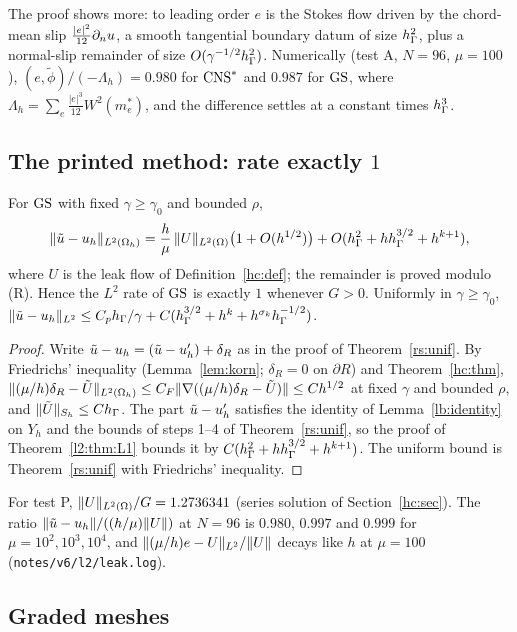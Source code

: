 The proof shows more: to leading order $e$ is the Stokes flow driven by the chord-mean slip $\frac{|e|^2}{12}\partial_n u$, a smooth tangential boundary datum of size $h_\Gamma^2$, plus a normal-slip remainder of size $O(\gamma^{-1/2}h_\Gamma^2)$. Numerically (test A, $N=96$, $\mu=100$), $(e,\tilde\phi)/(-\Lambda_h)=0.980$ for $\mathrm{CNS}^\ast$ and $0.987$ for $\GS$, where $\Lambda_h=\sum_e\frac{|e|^3}{12}W^2(m_e^\ast)$, and the difference settles at a constant times $h_\Gamma^3$.

\subsection{The printed method: rate exactly \texorpdfstring{$1$}{1}}

\begin{theorem}[$L^2$ error of $\GS$]\label{l2:thm:L2}
For $\GS$ with fixed $\gamma\ge\gamma_0$ and bounded $\rho$,
\[
\lVert \tilde u-u_h\rVert_{L^2(\Omega_h)}=\frac h\mu\,\lVert U\rVert_{L^2(\Omega)}\bigl(1+O(h^{1/2})\bigr)+O(h_\Gamma^2+hh_\Gamma^{3/2}+h^{k+1}),
\]
where $U$ is the leak flow of Definition~\ref{hc:def}; the remainder is proved modulo (R). Hence the $L^2$ rate of $\GS$ is exactly $1$ whenever $G>0$. Uniformly in $\gamma\ge\gamma_0$, $\lVert \tilde u-u_h\rVert_{L^2}\le C_ph_\Gamma/\gamma+C(h_\Gamma^{3/2}+h^k+h^{\sigma_k}h_\Gamma^{-1/2})$.
\end{theorem}

\begin{proof}
Write $\tilde u-u_h=(\tilde u-u_h')+\delta_R$ as in the proof of Theorem~\ref{rs:unif}. By Friedrichs' inequality (Lemma~\ref{lem:korn}; $\delta_R=0$ on $\partial R$) and Theorem~\ref{hc:thm}, $\lVert (\mu/h)\delta_R-\tilde U\rVert_{L^2(\Omega_h)}\le C_F\lVert \nabla((\mu/h)\delta_R-\tilde U)\rVert\le Ch^{1/2}$ at fixed $\gamma$ and bounded $\rho$, and $\lVert \tilde U\rVert_{S_h}\le Ch_\Gamma$. The part $\tilde u-u_h'$ satisfies the identity of Lemma~\ref{lb:identity} on $Y_h$ and the bounds of steps 1--4 of Theorem~\ref{rs:unif}, so the proof of Theorem~\ref{l2:thm:L1} bounds it by $C(h_\Gamma^2+hh_\Gamma^{3/2}+h^{k+1})$. The uniform bound is Theorem~\ref{rs:unif} with Friedrichs' inequality.
\end{proof}

For test P, $\lVert U\rVert_{L^2(\Omega)}/G=1.2736341$ (series solution of Section~\ref{hc:sec}). The ratio $\lVert \tilde u-u_h\rVert/((h/\mu)\lVert U\rVert)$ at $N=96$ is $0.980$, $0.997$ and $0.999$ for $\mu=10^2,10^3,10^4$, and $\lVert (\mu/h)e-U\rVert_{L^2}/\lVert U\rVert$ decays like $h$ at $\mu=100$ (\texttt{notes/v6/l2/leak.log}).

\subsection{Graded meshes}\label{l2:sec:graded}

